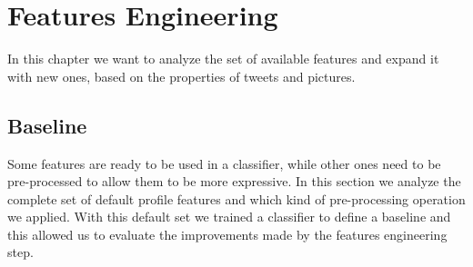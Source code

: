 \chapter{Features Engineering}
\label{capitolo4}
\thispagestyle{empty}

In this chapter we want to analyze the set of available features and expand it with new ones, based on the properties of tweets and pictures. 

\section{Baseline}
Some features are ready to be used in a classifier, while other ones need to be pre-processed to allow them to be more expressive. In this section we analyze the complete set of default profile features and which kind of pre-processing operation we applied. With this default set we trained a classifier to define a baseline and this allowed us to evaluate the improvements made by the features engineering step.

